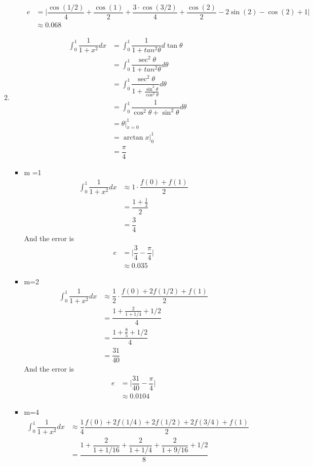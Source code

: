 \documentclass{article}
\begin{document}
\begin{enumerate}
\begin{enumerate}
\begin{itemize}
\begin{align*}
e &= \Big|\dfrac{\cos(1/2)}{4}+\dfrac{\cos(1)}{2}+\dfrac{3\cdot \cos(3/2)}{4}+\dfrac{\cos(2)}{2}-2\sin(2)-\cos(2)+1\Big|\\
&\approx 0.068
\end{align*}
\end{itemize}
\item
\begin{align*}
\int_0^1 \dfrac{1}{1+x^2} dx&=\int_0^1\dfrac{1}{1+tan^2\theta} d \tan\theta\\
&=\int_0^1\dfrac{\sec^2\theta}{1+tan^2\theta} d \theta\\
&=\int_0^1\dfrac{\sec^2\theta}{1+\frac{\sin^2\theta}{\cos^2\theta}} d \theta\\
&=\int_0^1\dfrac{1}{\cos^2\theta+{\sin^2\theta}} d \theta\\
&=\theta|_{x=0}^1\\
&=\arctan x|_0^1\\
&=\dfrac{\pi}{4}
\end{align*}
\begin{itemize}
\item  m =1
\begin{align*}
\int_0^1 \dfrac{1}{1+x^2} dx&\approx 1\cdot \dfrac{f(0)+f(1)}{2}\\
&=\dfrac{1+\frac{1}{2}}{2}\\
&=\dfrac{3}{4}
\end{align*}
And the error is \begin{align*}
e&=\Big|\dfrac{3}{4}-\dfrac{\pi}{4}\Big|\\
&\approx 0.035
\end{align*}
\item m=2
\begin{align*}
\int_0^1 \dfrac{1}{1+x^2} dx&\approx \dfrac{1}{2}\cdot \dfrac{f(0)+2f(1/2)+f(1)}{2}\\
&=\dfrac{1+\frac{2}{1+1/4}+1/2}{4}\\
&=\dfrac{1+\frac{8}{5}+1/2}{4}\\
&=\dfrac{31}{40}
\end{align*}
And the error is
\begin{align*}
e&=\Big|\dfrac{31}{40}-\dfrac{\pi}{4}\Big|\\
&\approx 0.0104
\end{align*}
\item  m=4
\begin{align*}
\int_0^1 \dfrac{1}{1+x^2} dx&\approx \dfrac{1}{4}\dfrac{f(0)+2f(1/4)+2f(1/2)+2f(3/4)+f(1)}{2}\\
&=\dfrac{1+\dfrac{2}{1+1/16}+\dfrac{2}{1+1/4}+\dfrac{2}{1+9/16}+1/2}{8}\\

\end{align*}
\end{itemize}
\end{enumerate}
\end{enumerate}
\end{document}
